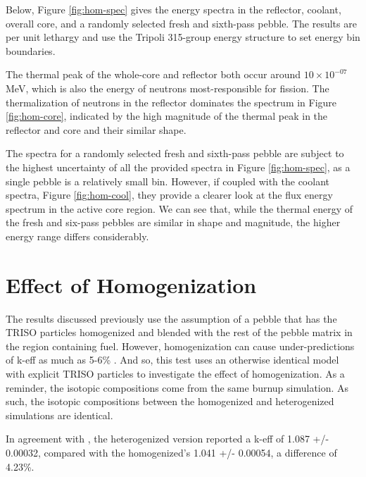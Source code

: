 Below, Figure \ref{fig:hom-spec} gives the energy spectra in the reflector, coolant, overall core, and a randomly selected fresh and sixth-pass pebble.  The results are per unit lethargy and use the Tripoli 315-group energy structure \cite{noauthor_tripoli_nodate} to set energy bin boundaries.



The thermal peak of the whole-core and reflector both occur around $10\times10^{-07}$ MeV, which is also the energy of neutrons most-responsible for fission.  The thermalization of neutrons in the reflector dominates the spectrum in Figure \ref{fig:hom-core}, indicated by the high magnitude of the thermal peak in the reflector and core and their similar shape.



The spectra for a randomly selected fresh and sixth-pass pebble are subject to the highest uncertainty of all the provided spectra in Figure \ref{fig:hom-spec}, as a single pebble is a relatively small bin.  However, if coupled with the coolant spectra, Figure \ref{fig:hom-cool}, they provide a clearer look at the flux energy spectrum in the active core region.  We can see that, while the thermal energy of the fresh and six-pass pebbles are similar in shape and magnitude, the higher energy range differs considerably.


\section{Effect of Homogenization}
\label{res-hom}

The results discussed previously use the assumption of a pebble that has the TRISO particles homogenized and blended with the rest of the pebble matrix in the region containing fuel.  However, homogenization can cause under-predictions of k-eff as much as 5-6\% \cite{brown_stochastic_2005}.  And so, this test uses an otherwise identical model with explicit TRISO particles to investigate the effect of homogenization.  As a reminder, the isotopic compositions come from the same burnup simulation.  As such, the isotopic compositions between the homogenized and heterogenized simulations are identical.





In agreement with \cite{brown_stochastic_2005}, the heterogenized version reported a k-eff of 1.087 +/- 0.00032, compared with the homogenized's 1.041 +/- 0.00054, a difference of 4.23\%.  

